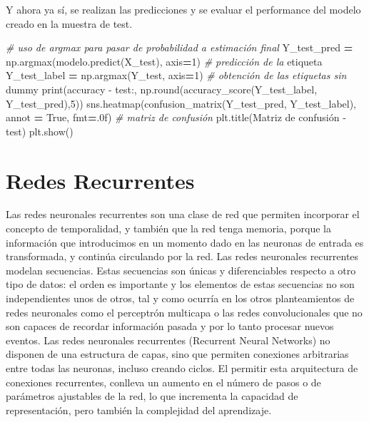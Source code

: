 \documentclass[
  a4paper,
  DIV=11,
  numbers=noendperiod]{scrreprt}
\newenvironment{Shaded}{\begin{snugshade}}{\end{snugshade}}
\newcommand{\BuiltInTok}[1]{#1}
\newcommand{\CommentTok}[1]{\textcolor[rgb]{0.56,0.35,0.01}{\textit{#1}}}
\newcommand{\DecValTok}[1]{\textcolor[rgb]{0.00,0.00,0.81}{#1}}
\newcommand{\NormalTok}[1]{#1}
\newcommand{\OperatorTok}[1]{\textcolor[rgb]{0.81,0.36,0.00}{\textbf{#1}}}
\newcommand{\StringTok}[1]{\textcolor[rgb]{0.31,0.60,0.02}{#1}}
\newcommand{\VariableTok}[1]{\textcolor[rgb]{0.00,0.00,0.00}{#1}}
\begin{document}
Y ahora ya sí, se realizan las predicciones y se evaluar el performance
del modelo creado en la muestra de test.

\begin{Shaded}
\begin{Highlighting}[numbers=left,,]
\CommentTok{\# uso de argmax para pasar de probabilidad a estimación final}
\NormalTok{Y\_test\_pred }\OperatorTok{=}\NormalTok{ np.argmax(modelo.predict(X\_test), axis}\OperatorTok{=}\DecValTok{1}\NormalTok{) }\CommentTok{\# predicción de la}
\NormalTok{etiqueta}
\NormalTok{Y\_test\_label }\OperatorTok{=}\NormalTok{ np.argmax(Y\_test, axis}\OperatorTok{=}\DecValTok{1}\NormalTok{) }\CommentTok{\# obtención de las etiquetas sin}
\NormalTok{dummy}
\BuiltInTok{print}\NormalTok{(}\StringTok{\textquotesingle{}accuracy {-} test:\textquotesingle{}}\NormalTok{, np.}\BuiltInTok{round}\NormalTok{(accuracy\_score(Y\_test\_label,}
\NormalTok{Y\_test\_pred),}\DecValTok{5}\NormalTok{))}
\NormalTok{sns.heatmap(confusion\_matrix(Y\_test\_pred, Y\_test\_label), annot }\OperatorTok{=} \VariableTok{True}\NormalTok{,}
\NormalTok{fmt}\OperatorTok{=}\StringTok{\textquotesingle{}.0f\textquotesingle{}}\NormalTok{) }\CommentTok{\# matriz de confusión}
\NormalTok{plt.title(}\StringTok{\textquotesingle{}Matriz de confusión {-} test\textquotesingle{}}\NormalTok{)}
\NormalTok{plt.show()}
\end{Highlighting}
\end{Shaded}

\section{Redes Recurrentes}\label{redes-recurrentes}

Las redes neuronales recurrentes son una clase de red que permiten
incorporar el concepto de temporalidad, y también que la red tenga
memoria, porque la información que introducimos en un momento dado en
las neuronas de entrada es transformada, y continúa circulando por la
red. Las redes neuronales recurrentes modelan secuencias. Estas
secuencias son únicas y diferenciables respecto a otro tipo de datos: el
orden es importante y los elementos de estas secuencias no son
independientes unos de otros, tal y como ocurría en los otros
planteamientos de redes neuronales como el perceptrón multicapa o las
redes convolucionales que no son capaces de recordar información pasada
y por lo tanto procesar nuevos eventos. Las redes neuronales recurrentes
(Recurrent Neural Networks) no disponen de una estructura de capas, sino
que permiten conexiones arbitrarias entre todas las neuronas, incluso
creando ciclos. El permitir esta arquitectura de conexiones recurrentes,
conlleva un aumento en el número de pasos o de parámetros ajustables de
la red, lo que incrementa la capacidad de representación, pero también
la complejidad del aprendizaje.
\end{document}
